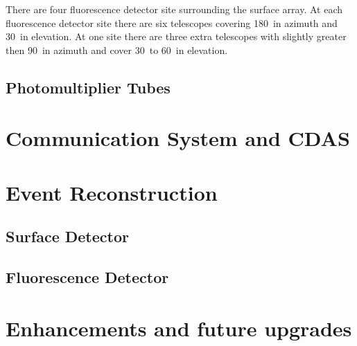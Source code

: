 There are four fluorescence detector site surrounding the surface array. At each fluorescence detector site there are six telescopes covering 180\textdegree \ in azimuth and 30\textdegree \ in elevation. At one site there are three extra telescopes with slightly greater then 90\textdegree \ in azimuth and cover 30\textdegree \ to 60\textdegree \ in elevation.

\subsection{Photomultiplier Tubes}

\section{Communication System and CDAS}

\section{Event Reconstruction}

\subsection{Surface Detector}

\subsection{Fluorescence Detector}

\section{Enhancements and future upgrades}